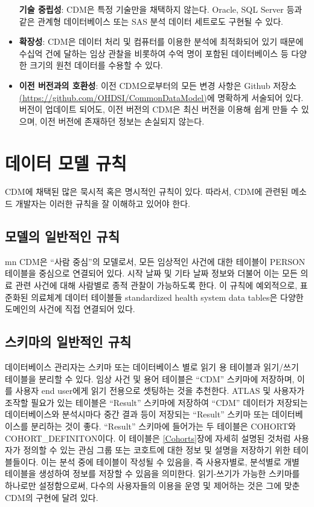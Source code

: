 \documentclass[10.5pt]{book}
\theoremstyle{definition}
\theoremstyle{definition}
\theoremstyle{definition}
\theoremstyle{remark}
\begin{document}
\begin{itemize}
  \textbf{기술 중립성}: CDM은 특정 기술만을 채택하지 않는다. Oracle, SQL
  Server 등과 같은 관계형 데이터베이스 또는 SAS 분석 데이터 세트로도
  구현될 수 있다.
\item
  \textbf{확장성}: CDM은 데이터 처리 및 컴퓨터를 이용한 분석에
  최적화되어 있기 때문에 수십억 건에 달하는 임상 관찰을 비롯하여 수억
  명이 포함된 데이터베이스 등 다양한 크기의 원천 데이터를 수용할 수
  있다.
\item
  \textbf{이전 버전과의 호환성}: 이전 CDM으로부터의 모든 변경 사항은
  Github 저장소
  \href{https://github.com/OHDSI/CommonDataModel}{(https://github.com/OHDSI/CommonDataModel)}에
  명확하게 서술되어 있다. 버전이 업데이트 되어도, 이전 버전의 CDM은 최신
  버전을 이용해 쉽게 만들 수 있으며, 이전 버전에 존재하던 정보는
  손실되지 않는다.
\end{itemize}

\section{데이터 모델 규칙}\label{--}

CDM에 채택된 많은 묵시적 혹은 명시적인 규칙이 있다. 따라서, CDM에 관련된
메소드 개발자는 이러한 규칙을 잘 이해하고 있어야 한다.

\subsection{모델의 일반적인 규칙}\label{model-Conv}

mn CDM은 ``사람 중심''의 모델로서, 모든 임상적인 사건에 대한 테이블이
PERSON 테이블을 중심으로 연결되어 있다. 시작 날짜 및 기타 날짜 정보와
더불어 이는 모든 의료 관련 사건에 대해 사람별로 종적 관찰이 가능하도록
한다. 이 규칙에 예외적으로, 표준화된 의료체계 데이터 테이블들
standardized health system data tables은 다양한 도메인의 사건에 직접
연결되어 있다.

\subsection{스키마의 일반적인 규칙}\label{--}

데이터베이스 관리자는 스키마 또는 데이터베이스 별로 읽기 용 테이블과
읽기/쓰기 테이블을 분리할 수 있다. 임상 사건 및 용어 테이블은 ``CDM''
스키마에 저장하며, 이를 사용자 end user에게 읽기 전용으로 셋팅하는 것을
추천한다. ATLAS 및 사용자가 조작할 필요가 있는 테이블은 ``Result''
스키마에 저장하여 ``CDM'' 데이터가 저장되는 데이터베이스와 분석시마다
중간 결과 등이 저장되는 ``Result'' 스키마 또는 데이터베이스를 분리하는
것이 좋다. ``Result'' 스키마에 들어가는 두 테이블은 COHORT와
COHORT\_DEFINITON이다. 이 테이블은 \ref{Cohorts}장에 자세히 설명된
것처럼 사용자가 정의할 수 있는 관심 그룹 또는 코호트에 대한 정보 및
설명을 저장하기 위한 테이블들이다. 이는 분석 중에 테이블이 작성될 수
있음을, 즉 사용자별로, 분석별로 개별 테이블을 생성하여 정보를 저장할 수
있음을 의미한다. 읽기-쓰기가 가능한 스키마를 하나로만 설정함으로써,
다수의 사용자들의 이용을 운영 및 제어하는 것은 그에 맞춘 CDM의 구현에
달려 있다.
\end{document}
